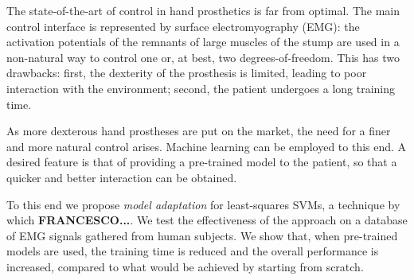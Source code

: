 The state-of-the-art of control in hand prosthetics is far from
optimal. The main control interface is represented by surface
electromyography (EMG): the activation potentials of the remnants of
large muscles of the stump are used in a non-natural way to control
one or, at best, two degrees-of-freedom. This has two drawbacks:
first, the dexterity of the prosthesis is limited, leading to poor
interaction with the environment; second, the patient undergoes a long
training time.

As more dexterous hand prostheses are put on the market, the need
for a finer and more natural control arises. Machine learning can be
employed to this end. A desired feature is that of providing a
pre-trained model to the patient, so that a quicker and better
interaction can be obtained.

To this end we propose \emph{model adaptation} for least-squares SVMs,
a technique by which \textbf{FRANCESCO...}. We test the effectiveness
of the approach on a database of EMG signals gathered from human
subjects.
We show that, when pre-trained models are used, the training time is reduced and the overall performance is increased,
compared to what would be achieved by starting from scratch.
